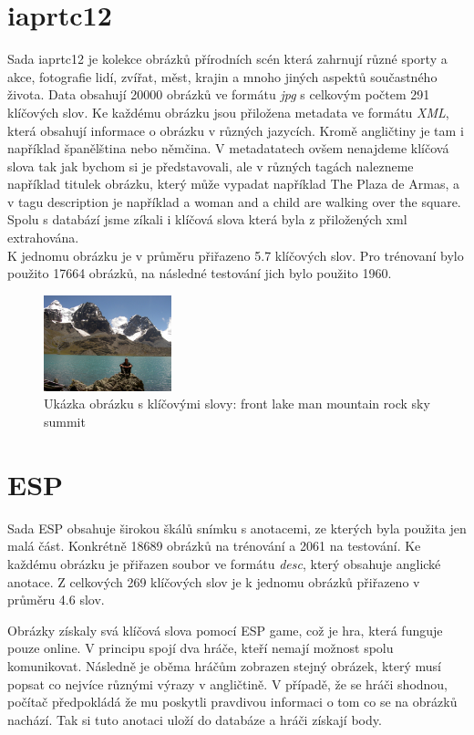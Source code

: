 \documentclass[czech,BP]{thesiskiv}
\begin{document}
\section{iaprtc12}
\par Sada iaprtc12 je kolekce obrázků přírodních scén která zahrnují různé sporty a akce, fotografie lidí, zvířat, měst, krajin a mnoho jiných aspektů součastného života. Data obsahují \num{20 000} obrázků ve formátu \textit{jpg} s celkovým počtem \num{291} klíčových slov. Ke každému obrázku jsou přiložena metadata ve formátu \textit{XML}, která obsahují informace o obrázku v různých jazycích. Kromě angličtiny je tam i například španělština nebo němčina. V metadatatech ovšem nenajdeme klíčová slova tak jak bychom si je představovali, ale v různých tagách nalezneme například titulek obrázku, který může vypadat například The Plaza de Armas, a v tagu description je například  a woman and a child are walking over the square. Spolu s databází jsme zíkali i klíčová slova která byla z přiložených xml extrahována.\\
K jednomu obrázku je v průměru přiřazeno \num{5.7} klíčových slov. Pro trénovaní bylo použito \num{17 664} obrázků, na následné testování jich bylo použito \num{1960}. 


\begin{figure}[h]
		\centering
		\includegraphics[width=140px]{./img/iaprtc12.jpg}	
		\caption{Ukázka obrázku s klíčovými slovy: front lake man mountain rock sky summit}
\end{figure}

\section{ESP}
\par Sada ESP obsahuje širokou škálů snímku s anotacemi, ze kterých byla použita jen malá část. Konkrétně \num{18 689} obrázků na trénování a \num{2061} na testování. Ke každému obrázku je přiřazen soubor ve formátu \textit{desc}, který obsahuje anglické anotace. Z celkových 269 klíčových slov je k jednomu obrázků přiřazeno v průměru 4.6 slov.

\par Obrázky získaly svá klíčová slova pomocí ESP game, což je hra, která funguje pouze online. V principu spojí dva hráče, kteří nemají možnost spolu komunikovat. Následně je oběma hráčům zobrazen stejný obrázek, který musí popsat co nejvíce různými výrazy v angličtině. V případě, že se hráči shodnou, počítač předpokládá že mu poskytli pravdivou informaci o tom co se na obrázků nachází. Tak si tuto anotaci uloží do databáze a hráči získají body.
\end{document}
